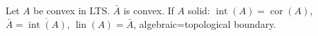 Let $A$ be convex in LTS. $\bar{A}$ is convex. If $A$ solid: $\operatorname{int}(A)=\operatorname{cor}(A)$, $\bar{A}=\overline{\operatorname{int}(A)}$, $\operatorname{lin}(A)=\bar{A}$, algebraic=topological boundary.
